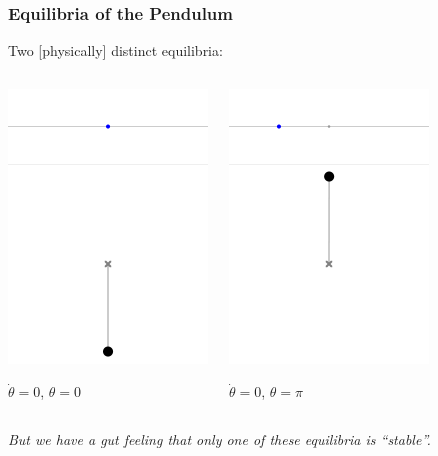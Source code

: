 \documentclass[12pt]{beamer}
\begin{document}
\begin{frame}
\frametitle{Equilibria of the Pendulum}

Two [physically] distinct equilibria:

\begin{columns}


\begin{center}
\includegraphics[width=.4\linewidth]{pic/Pendulum_0deg.png}

$\dot\theta = 0$, $\theta=0$

\end{center}



\begin{center}
\includegraphics[width=.4\linewidth]{pic/Pendulum_180deg.png}

$\dot\theta = 0$, $\theta=\pi$
\end{center}


\end{columns}

\vfill
\emph{But we have a gut feeling that only one of these equilibria is ``stable''.}

\end{frame}
\end{document}
